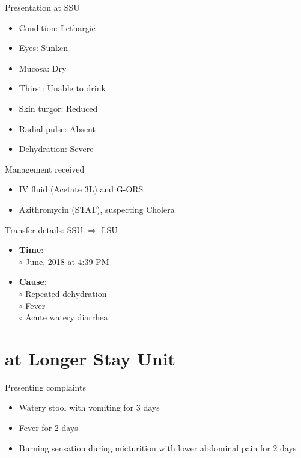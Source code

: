 \documentclass[10pt]{beamer}
\begin{document}
{
\begin{frame}{Presentation at SSU}
	\begin{itemize}
		\item Condition: Lethargic 
		\item Eyes: Sunken
		\item Mucosa: Dry
		\item Thirst: Unable to drink 
		\item Skin turgor: Reduced
		\item Radial pulse: Absent 
		\item Dehydration: Severe
	\end{itemize}
\end{frame}	
}

{
	\begin{frame}{Management received}
		\begin{itemize}
			\item IV fluid (Acetate 3L) and G-ORS
			\item Azithromycin (STAT), suspecting Cholera
		\end{itemize}
	\end{frame}	
}

{
	\begin{frame}{Transfer details: SSU $\Rightarrow$ LSU}
		\begin{itemize}
			\item \textbf{Time}:\\
			{\color{blue}$\circ$}  June, 2018 at 4:39 PM
			\item \textbf{Cause}: \\
			{\color{blue}$\circ$} Repeated dehydration \\
			{\color{blue}$\circ$} Fever \\
			{\color{blue}$\circ$} Acute watery diarrhea 
		\end{itemize}
	\end{frame}	
}

\section{at Longer Stay Unit}

{
\begin{frame}{Presenting complaints}
	\begin{itemize}
		\item Watery stool with vomiting for 3 days
		\item Fever for 2 days
		\item Burning sensation during micturition with lower abdominal pain for 2 days
	\end{itemize}
\end{frame}	
}
\end{document}
